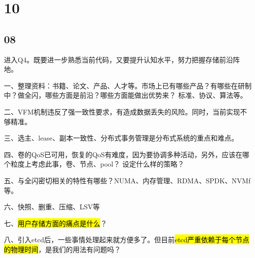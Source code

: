 \section{10}

\subsection{08}

进入Q4。既要进一步熟悉当前代码，又要提升认知水平，努力把握存储前沿阵地。

一、整理资料：书籍、论文、产品、人才等。市场上已有哪些产品？有哪些在研制中？做全闪，哪些方面是前沿？哪些方面能做出优势来？
标准、协议、算法等。

二、VFM机制违反了强一致性要求，有造成数据丢失的风险。同时，当前实现不够精准。

三、选主、lease、副本一致性、分布式事务管理是分布式系统的重点和难点。

四、卷的QoS已可用，恢复的QoS有难度，因为要协调多种活动，另外，应该在哪个粒度上考虑此事，卷、节点、pool？
设定什么样的策略？

五、与全闪密切相关的特性有哪些？NUMA、内存管理、RDMA、SPDK、NVMf等。

六、快照、删重、压缩、LSV等

七、\hl{用户存储方面的痛点是什么}？

八、引入etcd后，一些事情处理起来就方便多了。但目前\hl{etcd严重依赖于每个节点的物理时间}，是我们的用法有问题吗？
